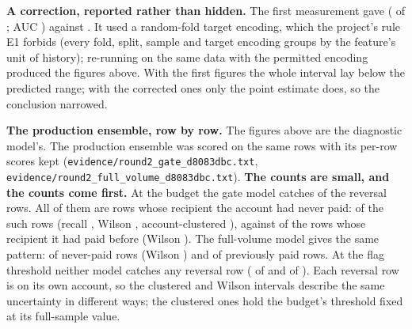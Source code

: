 \textbf{A correction, reported rather than hidden.} The first measurement gave \nRevRecallFirst{}
\nRevCIFirst{} (\nRevCaughtFirst{} of \nRevFraud{}; AUC \nRevAUCFirst{}) against
\nBaseVarRecallFirst{} \nBaseVarCIFirst{}. It used a random-fold target encoding, which the project's
rule E1 forbids (every fold, split, sample and target encoding groups by the feature's unit of
history); re-running on the same data with the permitted encoding produced the figures above. With
the first figures the whole interval lay below the predicted range; with the corrected ones only the
point estimate does, so the conclusion narrowed.

\textbf{The production ensemble, row by row.} The figures above are the diagnostic model's. The
production ensemble was scored on the same rows with its per-row scores kept
(\texttt{evidence/\allowbreak round2\_\allowbreak gate\_\allowbreak d8083dbc.txt},
\texttt{evidence/\allowbreak round2\_\allowbreak full\_\allowbreak volume\_\allowbreak d8083dbc.txt}). \textbf{The counts are small,
and the counts come first.} At the \nFPRBudget{} budget the gate model catches \nGateRevAllBudgetCaught{}
of the \nGateRevAllBudgetRows{} reversal rows. All of them are rows whose recipient the account had
never paid: \nGateRevNewBudgetCaught{} of the \nGateRevNewBudgetRows{} such rows (recall
\nGateRevNewBudgetRecall{}, Wilson \nGateRevNewBudgetWilson{}, account-clustered
\nGateRevNewBudgetClustered{}), against \nGateRevKnownBudgetCaught{} of the
\nGateRevKnownBudgetRows{} rows whose recipient it had paid before (Wilson
\nGateRevKnownBudgetWilson{}). The full-volume model gives the same pattern:
\nFvRevNewBudgetCaught{} of \nFvRevNewBudgetRows{} never-paid rows (Wilson \nFvRevNewBudgetWilson{})
and \nFvRevKnownBudgetCaught{} of \nFvRevKnownBudgetRows{} previously paid rows. At the flag threshold
neither model catches any reversal row (\nGateRevAllFlagCaught{} of \nGateRevAllFlagRows{} and
\nFvRevAllFlagCaught{} of \nFvRevAllFlagRows{}). Each reversal row is on its own account, so the
clustered and Wilson intervals describe the same uncertainty in different ways; the clustered ones hold
the budget's threshold fixed at its full-sample value.

